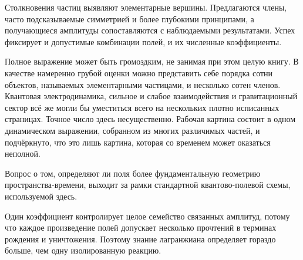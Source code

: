 Столкновения частиц выявляют элементарные вершины. Предлагаются члены, часто подсказываемые симметрией и более глубокими принципами, а получающиеся амплитуды сопоставляются с наблюдаемыми результатами. Успех фиксирует и допустимые комбинации полей, и их численные коэффициенты.

\begin{classroomqa}
\end{classroomqa}

Полное выражение может быть громоздким, не занимая при этом целую книгу. В качестве намеренно грубой оценки можно представить себе порядка сотни объектов, называемых элементарными частицами, и несколько сотен членов. Квантовая электродинамика, сильное и слабое взаимодействия и гравитационный сектор всё же могли бы уместиться всего на нескольких плотно исписанных страницах. Точное число здесь несущественно. Рабочая картина состоит в одном динамическом выражении, собранном из многих различимых частей, и подчёркнуто, что это лишь картина, которая со временем может оказаться неполной.

Вопрос о том, определяют ли поля более фундаментальную геометрию пространства-времени, выходит за рамки стандартной квантово-полевой схемы, используемой здесь.

\begin{classroomqa}
\end{classroomqa}

Один коэффициент контролирует целое семейство связанных амплитуд, потому что каждое произведение полей допускает несколько прочтений в терминах рождения и уничтожения. Поэтому знание лагранжиана определяет гораздо больше, чем одну изолированную реакцию.

